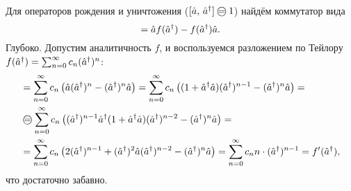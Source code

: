 Для операторов рождения и уничтожения ($[\hat{a},\,  \hat{a}\con] \oeq  1$) найдём коммутатор вида 
\begin{equation*}
    [\hat{a},\, f(\hat{a}\con)] = \hat{a} f(\hat{a}\con) - f(\hat{a}\con) \hat{a}.
\end{equation*}
Глубоко. Допустим аналитичность $f$, и воспользуемся разложением по Тейлору $f(\hat{a}^{\dag}) = \sum_{n=0}^{\infty} c_n (\hat{a}^{\dag})^n$:
\begin{align*}
    [\hat{a},\, f(\hat{a}\con)] 
    &=
    \sum_{n=0}^{\infty}  c_n \left(
        \hat{a} (\hat{a}\con)^n - (\hat{a}\con)^n \hat{a}
    \right) 
    = 
    \sum_{n=0}^{\infty} c_n \left(
        (1 + \hat{a}\con \hat{a}) (\hat{a}\con)^{n-1} - (\hat{a}\con)^n \hat{a}
    \right) 
    = \\ &\oeq
    \sum_{n=0}^{\infty}  c_n \left(
        (\hat{a}\con)^{n-1} \hat{a}\con (1 + \hat{a}\con \hat{a}) (\hat{a}\con)^{n-2}- (\hat{a}\con)^n \hat{a}
    \right) 
    = \\ &= 
    \sum_{n=0}^{\infty}  c_n \left(
        2 (\hat{a}\con)^{n-1} + (\hat{a}\con)^2 \hat{a} (\hat{a}\con)^{n-2} - 
        (\hat{a}\con)^n \hat{a}
    \right) 
    = 
    \sum_{n=0}^{\infty}  c_n n \cdot (\hat{a}\con)^{n-1} = f'(\hat{a}\con),
\end{align*}
что достаточно забавно. 
